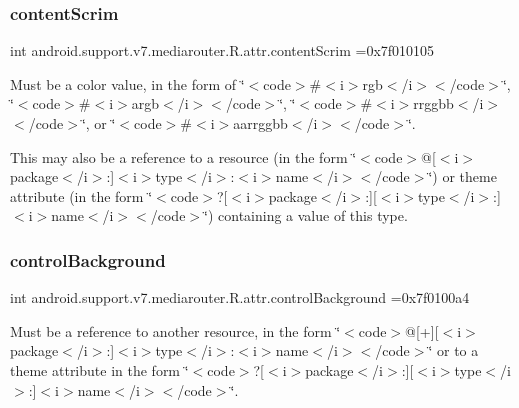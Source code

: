 \subsubsection{\texorpdfstring{content\+Scrim}{contentScrim}}
{\footnotesize\ttfamily int android.\+support.\+v7.\+mediarouter.\+R.\+attr.\+content\+Scrim =0x7f010105\hspace{0.3cm}{\ttfamily [static]}}

Must be a color value, in the form of \char`\"{}$<$code$>$\#$<$i$>$rgb$<$/i$>$$<$/code$>$\char`\"{}, \char`\"{}$<$code$>$\#$<$i$>$argb$<$/i$>$$<$/code$>$\char`\"{}, \char`\"{}$<$code$>$\#$<$i$>$rrggbb$<$/i$>$$<$/code$>$\char`\"{}, or \char`\"{}$<$code$>$\#$<$i$>$aarrggbb$<$/i$>$$<$/code$>$\char`\"{}. 

This may also be a reference to a resource (in the form \char`\"{}$<$code$>$@\mbox{[}$<$i$>$package$<$/i$>$\+:\mbox{]}$<$i$>$type$<$/i$>$\+:$<$i$>$name$<$/i$>$$<$/code$>$\char`\"{}) or theme attribute (in the form \char`\"{}$<$code$>$?\mbox{[}$<$i$>$package$<$/i$>$\+:\mbox{]}\mbox{[}$<$i$>$type$<$/i$>$\+:\mbox{]}$<$i$>$name$<$/i$>$$<$/code$>$\char`\"{}) containing a value of this type. \mbox{\label{classandroid_1_1support_1_1v7_1_1mediarouter_1_1R_1_1attr_a2979564b8ef31e5cdbaeefe947ce53dd}} 
\subsubsection{\texorpdfstring{control\+Background}{controlBackground}}
{\footnotesize\ttfamily int android.\+support.\+v7.\+mediarouter.\+R.\+attr.\+control\+Background =0x7f0100a4\hspace{0.3cm}{\ttfamily [static]}}

Must be a reference to another resource, in the form \char`\"{}$<$code$>$@\mbox{[}+\mbox{]}\mbox{[}$<$i$>$package$<$/i$>$\+:\mbox{]}$<$i$>$type$<$/i$>$\+:$<$i$>$name$<$/i$>$$<$/code$>$\char`\"{} or to a theme attribute in the form \char`\"{}$<$code$>$?\mbox{[}$<$i$>$package$<$/i$>$\+:\mbox{]}\mbox{[}$<$i$>$type$<$/i$>$\+:\mbox{]}$<$i$>$name$<$/i$>$$<$/code$>$\char`\"{}. \mbox{\label{classandroid_1_1support_1_1v7_1_1mediarouter_1_1R_1_1attr_a27efdede37a68aaeeb31d34c5648e300}} 
